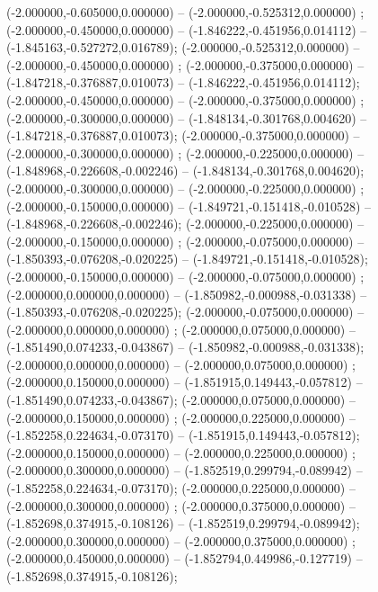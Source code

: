 (-2.000000,-0.605000,0.000000) -- (-2.000000,-0.525312,0.000000) ;
 (-2.000000,-0.450000,0.000000) -- (-1.846222,-0.451956,0.014112) -- (-1.845163,-0.527272,0.016789);
 (-2.000000,-0.525312,0.000000) -- (-2.000000,-0.450000,0.000000) ;
 (-2.000000,-0.375000,0.000000) -- (-1.847218,-0.376887,0.010073) -- (-1.846222,-0.451956,0.014112);
 (-2.000000,-0.450000,0.000000) -- (-2.000000,-0.375000,0.000000) ;
 (-2.000000,-0.300000,0.000000) -- (-1.848134,-0.301768,0.004620) -- (-1.847218,-0.376887,0.010073);
 (-2.000000,-0.375000,0.000000) -- (-2.000000,-0.300000,0.000000) ;
 (-2.000000,-0.225000,0.000000) -- (-1.848968,-0.226608,-0.002246) -- (-1.848134,-0.301768,0.004620);
 (-2.000000,-0.300000,0.000000) -- (-2.000000,-0.225000,0.000000) ;
 (-2.000000,-0.150000,0.000000) -- (-1.849721,-0.151418,-0.010528) -- (-1.848968,-0.226608,-0.002246);
 (-2.000000,-0.225000,0.000000) -- (-2.000000,-0.150000,0.000000) ;
 (-2.000000,-0.075000,0.000000) -- (-1.850393,-0.076208,-0.020225) -- (-1.849721,-0.151418,-0.010528);
 (-2.000000,-0.150000,0.000000) -- (-2.000000,-0.075000,0.000000) ;
 (-2.000000,0.000000,0.000000) -- (-1.850982,-0.000988,-0.031338) -- (-1.850393,-0.076208,-0.020225);
 (-2.000000,-0.075000,0.000000) -- (-2.000000,0.000000,0.000000) ;
 (-2.000000,0.075000,0.000000) -- (-1.851490,0.074233,-0.043867) -- (-1.850982,-0.000988,-0.031338);
 (-2.000000,0.000000,0.000000) -- (-2.000000,0.075000,0.000000) ;
 (-2.000000,0.150000,0.000000) -- (-1.851915,0.149443,-0.057812) -- (-1.851490,0.074233,-0.043867);
 (-2.000000,0.075000,0.000000) -- (-2.000000,0.150000,0.000000) ;
 (-2.000000,0.225000,0.000000) -- (-1.852258,0.224634,-0.073170) -- (-1.851915,0.149443,-0.057812);
 (-2.000000,0.150000,0.000000) -- (-2.000000,0.225000,0.000000) ;
 (-2.000000,0.300000,0.000000) -- (-1.852519,0.299794,-0.089942) -- (-1.852258,0.224634,-0.073170);
 (-2.000000,0.225000,0.000000) -- (-2.000000,0.300000,0.000000) ;
 (-2.000000,0.375000,0.000000) -- (-1.852698,0.374915,-0.108126) -- (-1.852519,0.299794,-0.089942);
 (-2.000000,0.300000,0.000000) -- (-2.000000,0.375000,0.000000) ;
 (-2.000000,0.450000,0.000000) -- (-1.852794,0.449986,-0.127719) -- (-1.852698,0.374915,-0.108126);
